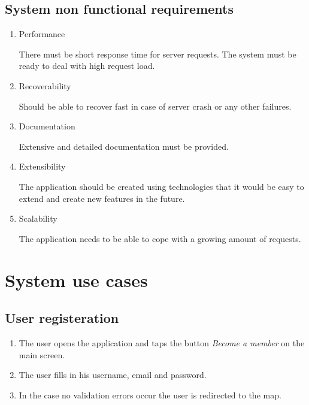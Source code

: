 \documentclass[thesis=M,english]{FITthesis}[2012/10/20]
\begin{document}
\subsection{System non functional requirements}

\begin{enumerate}

\item{Performance} 

There must be short response time for server requests. The system must be ready to deal with high request load.

\item{Recoverability}

Should be able to recover fast in case of server crash or any other failures.

\item{Documentation}

Extensive and detailed documentation must be provided.

\item{Extensibility}

The application should be created using technologies that it would be easy to extend and create new features in the future.

\item{Scalability}

The application needs to be able to cope with a growing amount of requests.
\end{enumerate}

\section{System use cases}

\subsection{User registeration}
\begin{enumerate}
	\item The user opens the application and taps the button \textit{Become a member} on the main screen.
	\item The user fills in his username, email and password.
	\item In the case no validation errors occur the user is redirected to the map.
\end{enumerate}
\end{document}
